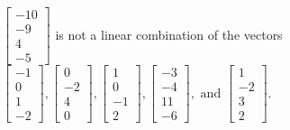\begin{exercise}
\begin{exerciseStatement}
  \end{exerciseStatement}
  \begin{exerciseAnswer}
   \(\left[\begin{array}{c}
-10 \\
-9 \\
4 \\
-5
\end{array}\right]\) 
  	 is not  
	a linear combination of the vectors \(\left[\begin{array}{c}
-1 \\
0 \\
1 \\
-2
\end{array}\right] , \left[\begin{array}{c}
0 \\
-2 \\
4 \\
0
\end{array}\right] , \left[\begin{array}{c}
1 \\
0 \\
-1 \\
2
\end{array}\right] , \left[\begin{array}{c}
-3 \\
-4 \\
11 \\
-6
\end{array}\right] , \text{ and } \left[\begin{array}{c}
1 \\
-2 \\
3 \\
2
\end{array}\right]\).

	
  


  \end{exerciseAnswer}
\end{exercise}